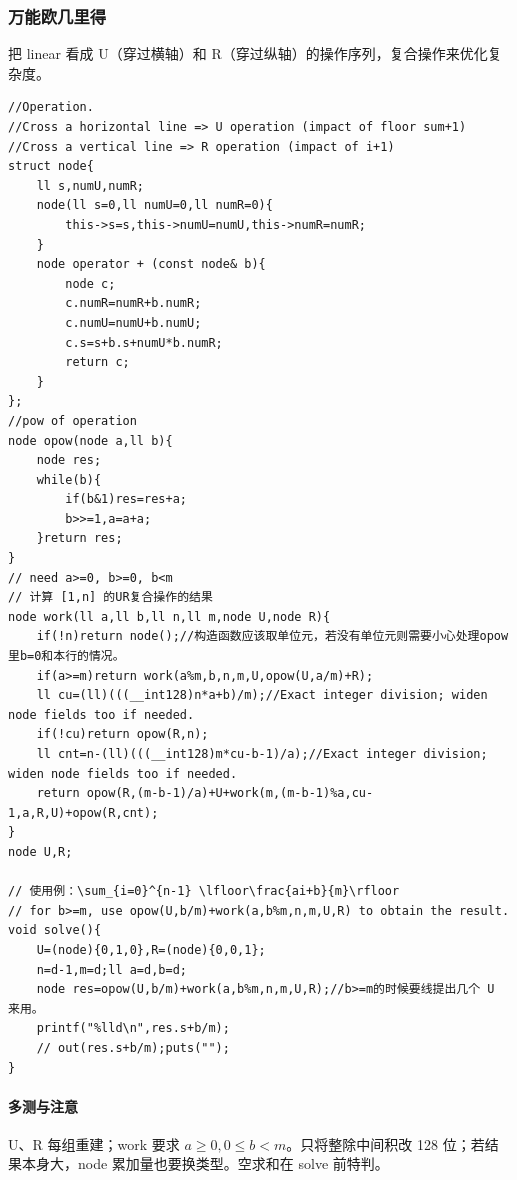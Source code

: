 \subsubsection{万能欧几里得}
把 linear 看成 U（穿过横轴）和 R（穿过纵轴）的操作序列，复合操作来优化复杂度。
\begin{lstlisting}
//Operation.
//Cross a horizontal line => U operation (impact of floor sum+1)
//Cross a vertical line => R operation (impact of i+1)
struct node{
    ll s,numU,numR;
    node(ll s=0,ll numU=0,ll numR=0){
        this->s=s,this->numU=numU,this->numR=numR;
    }
    node operator + (const node& b){
        node c;
        c.numR=numR+b.numR;
        c.numU=numU+b.numU;
        c.s=s+b.s+numU*b.numR;
        return c;
    }
};
//pow of operation
node opow(node a,ll b){
    node res;
    while(b){
        if(b&1)res=res+a;
        b>>=1,a=a+a;
    }return res;
}
// need a>=0, b>=0, b<m
// 计算 [1,n] 的UR复合操作的结果
node work(ll a,ll b,ll n,ll m,node U,node R){
    if(!n)return node();//构造函数应该取单位元，若没有单位元则需要小心处理opow里b=0和本行的情况。
    if(a>=m)return work(a%m,b,n,m,U,opow(U,a/m)+R);
    ll cu=(ll)(((__int128)n*a+b)/m);//Exact integer division; widen node fields too if needed.
    if(!cu)return opow(R,n);
    ll cnt=n-(ll)(((__int128)m*cu-b-1)/a);//Exact integer division; widen node fields too if needed.
    return opow(R,(m-b-1)/a)+U+work(m,(m-b-1)%a,cu-1,a,R,U)+opow(R,cnt);
}
node U,R;

// 使用例：\sum_{i=0}^{n-1} \lfloor\frac{ai+b}{m}\rfloor
// for b>=m, use opow(U,b/m)+work(a,b%m,n,m,U,R) to obtain the result.
void solve(){
	U=(node){0,1,0},R=(node){0,0,1};
    n=d-1,m=d;ll a=d,b=d;
    node res=opow(U,b/m)+work(a,b%m,n,m,U,R);//b>=m的时候要线提出几个 U 来用。
    printf("%lld\n",res.s+b/m);
    // out(res.s+b/m);puts("");
}
\end{lstlisting}

\paragraph{多测与注意} U、R 每组重建；work 要求 $a\ge0,0\le b<m$。只将整除中间积改 128 位；若结果本身大，node 累加量也要换类型。空求和在 solve 前特判。
